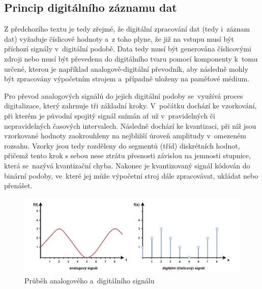 \subsection{Princip digitálního záznamu dat}
Z předchozího textu je tedy zřejmé, že digitální zpracování dat (tedy i~záznam dat) vyžaduje číslicové hodnoty a~z toho plyne, že již na vstupu musí být příchozí signály v~digitální podobě. Data tedy musí být generována číslicovými zdroji nebo musí být převedena do digitálního tvaru pomocí komponenty k~tomu určené, kterou je například analogově-digitální převodník, aby následně mohly být zpracovány výpočetním strojem a~případně uloženy na paměťové médium.

Pro převod analogových signálů do jejich digitální podoby se~využívá proces digitalizace, který zahrnuje tři základní kroky. V~počátku dochází ke vzorkování, při kterém je původní spojitý signál snímán ať už v~pravidelných či nepravidelných časových intervalech. Následně dochází ke kvantizaci, při níž jsou vzorkované hodnoty zaokrouhleny na nejbližší úroveň amplitudy v~omezeném rozsahu. Vzorky jsou tedy rozděleny do segmentů (tříd) diskrétních hodnot, přičemž tento krok s sebou nese ztrátu přesnosti závislou na jemnosti stupnice, která se~nazývá kvantizační chyba. Nakonec je kvantizovaný signál kódován do binární podoby, ve~které jej může výpočetní stroj dále zpracovávat, ukládat nebo přenášet.~\cite{ieee_digital_sound_recorder_arm_sd_card, matousek_sitove_aplikace}

\begin{figure}[h]
    \centering
    \includegraphics[width=1.00\textwidth]{obrazky-figures/digital_vs_analog.pdf}
    \caption{Průběh analogového a~digitálního signálu}
    \label{fig:digital-vs-analog}
\end{figure}

\newpage

